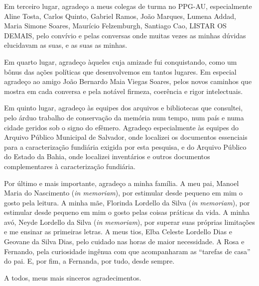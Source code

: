 \begin{agradecimentos}
Em terceiro lugar, agradeço a meus colegas de turma no PPG-AU, especialmente Aline Tosta, Carlos Quinto, Gabriel Ramos, João Marques, Lumena Addad, Maria Simone Soares, Maurício Felzemburgh, Santiago Cao, LISTAR OS DEMAIS, pelo convívio e pelas conversas onde muitas vezes as minhas dúvidas elucidavam as suas, e as suas as minhas.

Em quarto lugar, agradeço àqueles cuja amizade fui conquistando, como um bônus das ações políticas que desenvolvemos em tantos lugares. Em especial agradeço ao amigo João Bernardo Maia Viegas Soares, pelos novos caminhos que mostra em cada conversa e pela notável firmeza, coerência e rigor intelectuais.

Em quinto lugar, agradeço às equipes dos arquivos e bibliotecas que consultei, pelo árduo trabalho de conservação da memória num tempo, num país e numa cidade geridos sob o signo do efêmero. Agradeço especialmente às equipes do Arquivo Público Municipal de Salvador, onde localizei os documentos essenciais para a caracterização fundiária exigida por esta pesquisa, e do Arquivo Público do Estado da Bahia, onde localizei inventários e outros documentos complementares à caracterização fundiária.

Por último e mais importante, agradeço a minha família. A meu pai, Manoel Maria do Nascimento (\textit{in memoriam}), por estimular desde pequeno em mim o gosto pela leitura. A minha mãe, Florinda Lordello da Silva (\textit{in memoriam}), por estimular desde pequeno em mim o gosto pelas coisas práticas da vida. A minha avó, Neyde Lordello da Silva (\textit{in memoriam}), por superar suas próprias limitações e me ensinar as primeiras letras. A meus tios, Elba Celeste Lordello Dias e Geovane da Silva Dias, pelo cuidado nas horas de maior necessidade. A Rosa e Fernando, pela curiosidade ingênua com que acompanharam as ``tarefas de casa'' do pai. E, por fim, a Fernanda, por tudo, desde sempre.

A todos, meus mais sinceros agradecimentos.

\end{agradecimentos}
